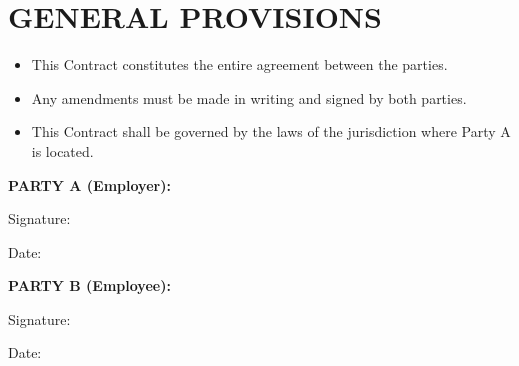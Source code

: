 \documentclass[12pt]{ctexart}
\begin{document}
\section*{GENERAL PROVISIONS}
\begin{itemize}[leftmargin=*,label={}]
    \item This Contract constitutes the entire agreement between the parties.
    \item Any amendments must be made in writing and signed by both parties.
    \item This Contract shall be governed by the laws of the jurisdiction where Party A is located.
\end{itemize}

\vspace{1cm}

\noindent \textbf{PARTY A (Employer):} \underline{\hspace{7cm}}

\noindent Signature: \underline{\hspace{7cm}}

\noindent Date: \underline{\hspace{7cm}}

\vspace{1cm}

\noindent \textbf{PARTY B (Employee):} \underline{\hspace{7cm}}

\noindent Signature: \underline{\hspace{7cm}}

\noindent Date: \underline{\hspace{7cm}}
\end{document}
